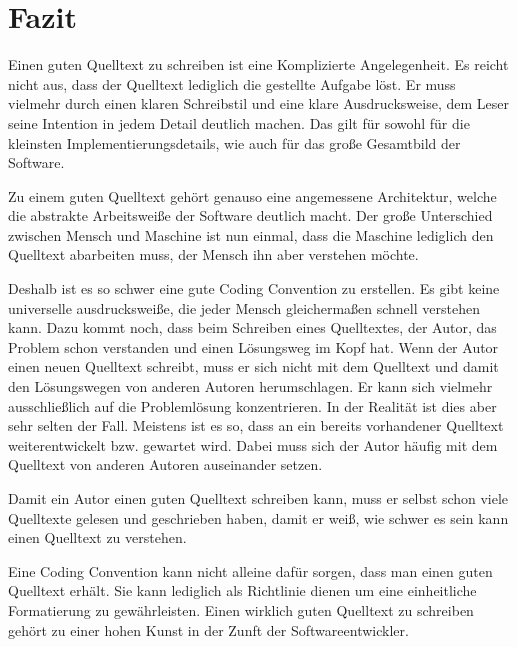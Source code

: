 \section{Fazit}

Einen guten Quelltext zu schreiben ist eine Komplizierte Angelegenheit. Es reicht nicht aus, dass der Quelltext lediglich die gestellte Aufgabe löst. Er muss vielmehr durch einen klaren Schreibstil und eine klare Ausdrucksweise, dem Leser seine Intention in jedem Detail deutlich machen. Das gilt für sowohl für die kleinsten Implementierungsdetails, wie auch für das große Gesamtbild der Software.

Zu einem guten Quelltext gehört genauso eine angemessene Architektur, welche die abstrakte Arbeitsweiße der Software deutlich macht. Der große Unterschied zwischen Mensch und Maschine ist nun einmal, dass die Maschine lediglich den Quelltext abarbeiten muss, der Mensch ihn aber verstehen möchte.

Deshalb ist es so schwer eine gute Coding Convention zu erstellen. Es gibt keine universelle ausdrucksweiße, die jeder Mensch gleichermaßen schnell verstehen kann. Dazu kommt noch, dass beim Schreiben eines Quelltextes, der Autor, das Problem schon verstanden und einen Lösungsweg im Kopf hat. Wenn der Autor einen neuen Quelltext schreibt, muss er sich nicht mit dem Quelltext und damit den Lösungswegen von anderen Autoren herumschlagen. Er kann sich vielmehr ausschließlich auf die Problemlösung konzentrieren. In der Realität ist dies aber sehr selten der Fall. Meistens ist es so, dass an ein bereits vorhandener Quelltext weiterentwickelt bzw. gewartet wird. Dabei muss sich der Autor häufig mit dem Quelltext von anderen Autoren auseinander setzen. 

Damit ein Autor einen guten Quelltext schreiben kann, muss er selbst schon viele Quelltexte gelesen und geschrieben haben, damit er weiß, wie schwer es sein kann einen Quelltext zu verstehen.

Eine Coding Convention kann nicht alleine dafür sorgen, dass man einen guten Quelltext erhält. Sie kann lediglich als Richtlinie dienen um eine einheitliche Formatierung zu gewährleisten. Einen wirklich guten Quelltext zu schreiben gehört zu einer hohen Kunst in der Zunft der Softwareentwickler.


